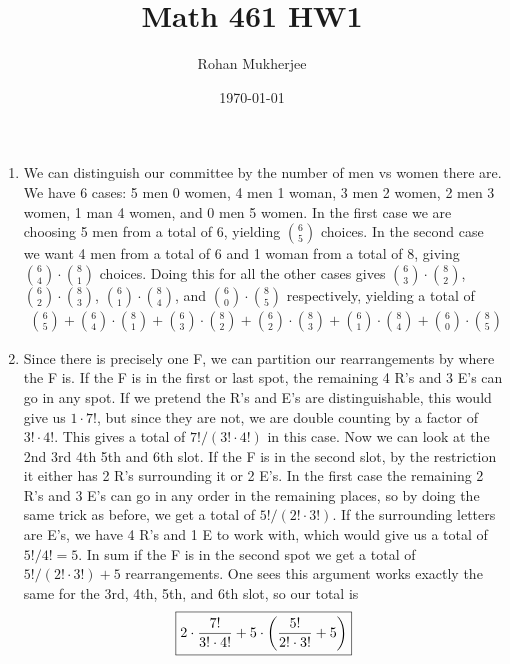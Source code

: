 \documentclass[12pt]{article}
\title{Math 461 HW1}
\date{\today}
\author{Rohan Mukherjee}
\theoremstyle{definition}
\theoremstyle{remark}
\begin{document}
	\maketitle
	\begin{enumerate}[leftmargin=\labelsep]
		\item We can distinguish our committee by the number of men vs women there are. We have 6 cases: 5 men 0 women, 4 men 1 woman, 3 men 2 women, 2 men 3 women, 1 man 4 women, and 0 men 5 women. In the first case we are choosing 5 men from a total of 6, yielding $6 \choose 5$ choices. In the second case we want 4 men from a total of 6 and 1 woman from a total of 8, giving ${6 \choose 4} \cdot {8 \choose 1}$ choices. Doing this for all the other cases gives ${6 \choose 3} \cdot {8 \choose 2}$, ${6 \choose 2} \cdot {8 \choose 3}$, ${6 \choose 1} \cdot {8 \choose 4}$, and ${6 \choose 0} \cdot {8 \choose 5}$ respectively, yielding a total of
		\begin{align*}
			\boxed{{6 \choose 5} + {6 \choose 4} \cdot {8 \choose 1} + {6 \choose 3} \cdot {8 \choose 2} + {6 \choose 2} \cdot {8 \choose 3} + {6 \choose 1} \cdot {8 \choose 4} + {6 \choose 0} \cdot {8 \choose 5}}
		\end{align*}
	
		\newpage
		\item Since there is precisely one F, we can partition our rearrangements by where the F is. If the F is in the first or last spot, the remaining 4 R's and 3 E's can go in any spot. If we pretend the R's and E's are distinguishable, this would give us $1 \cdot 7!$, but since they are not, we are double counting by a factor of $3! \cdot 4!$. This gives a total of $7!/(3! \cdot 4!)$ in this case. Now we can look at the 2nd 3rd 4th 5th and 6th slot. If the F is in the second slot, by the restriction it either has 2 R's surrounding it or 2 E's. In the first case the remaining 2 R's and 3 E's can go in any order in the remaining places, so by doing the same trick as before, we get a total of $5! / (2! \cdot 3!)$. If the surrounding letters are E's, we have 4 R's and 1 E to work with, which would give us a total of $5! / 4! = 5$. In sum if the F is in the second spot we get a total of $5!/(2! \cdot 3!) + 5$ rearrangements. One sees this argument works exactly the same for the 3rd, 4th, 5th, and 6th slot, so our total is
		\begin{align*}
			\boxed{2 \cdot \frac{7!}{3! \cdot 4!} + 5 \cdot \qty(\frac{5!}{2! \cdot 3!} + 5)}
		\end{align*}
	

\end{enumerate}
\end{document}
